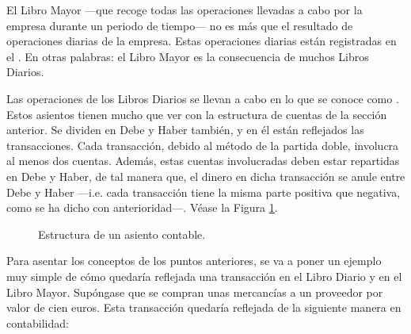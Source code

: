 El Libro Mayor ---que recoge todas las operaciones llevadas a cabo por la empresa durante un periodo de tiempo--- no es más que el resultado de operaciones diarias de la empresa. Estas operaciones diarias están registradas en el . En otras palabras: el Libro Mayor es la consecuencia de muchos Libros Diarios. 

Las operaciones de los Libros Diarios se llevan a cabo en lo que se conoce como . Estos asientos tienen mucho que ver con la estructura de cuentas de la sección anterior. Se dividen en Debe y Haber también, y en él están reflejados las transacciones. Cada transacción, debido al método de la partida doble, involucra al menos dos cuentas. Además, estas cuentas involucradas deben estar repartidas en Debe y Haber, de tal manera que, el dinero en dicha transacción se anule entre Debe y Haber ---i.e. cada transacción tiene la misma parte positiva que negativa, como se ha dicho con anterioridad---. Véase la Figura \ref{asiento}.
\begin{figure}[H]
    \centering
    \caption{Estructura de un asiento contable.}
    \label{asiento}
\end{figure}

Para asentar los conceptos de los puntos anteriores, se va a poner un ejemplo muy simple de cómo quedaría reflejada una transacción en el Libro Diario y en el Libro Mayor. Supóngase que se compran unas mercancías a un proveedor por valor de cien euros. Esta transacción quedaría reflejada de la siguiente manera en contabilidad:

